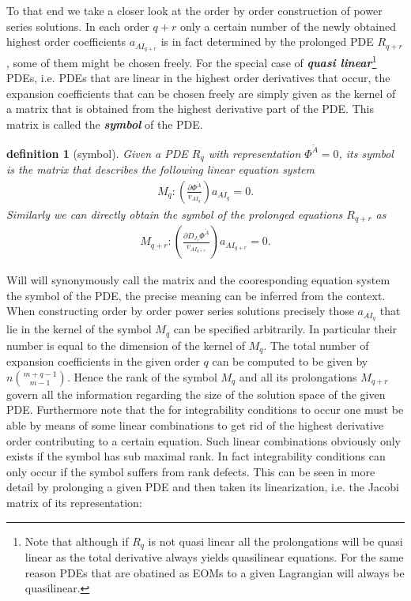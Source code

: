 \documentclass[a4paper,12pt, DIV=14, BCOR=5mm, twoside, headsepline]{scrbook}
\newtheorem{definition}{definition}[section]
\begin{document}
To that end we take a closer look at the order by order construction of power series solutions.
In each order $q+r$ only a certain number of the newly obtained highest order coefficients $a_{AI_{q+r}}$ is in fact determined by the prolonged PDE $R_{q+r}$, some of them might be chosen freely.
For the special case of \textit{\textbf{quasi linear}}\footnote{Note that although if $R_q$ is not quasi linear all the prolongations will be quasi linear as the total derivative always yields quasilinear equations. For the same reason PDEs that are obatined as EOMs to a given Lagrangian will always be quasilinear.} PDEs, i.e. PDEs that are linear in the highest order derivatives that occur, the expansion coefficients that can be chosen freely are simply given as the kernel of a matrix that is obtained from the highest derivative part of the PDE. This matrix is called the \textit{\textbf{symbol}} of the PDE.
\begin{definition}[symbol]
Given a PDE $R_q$ with representation $\Phi^{\tilde{A}}=0$, its symbol is the matrix that describes the following linear equation system 
\begin{align}
    M_q : \left ( \frac{\partial \Phi^{\tilde{A}}}{v_{AI_q}} \right ) a_{AI_q} = 0.
\end{align}
Similarly we can directly obtain the symbol of the prolonged equations $R_{q+r}$ as  
\begin{align}
    M_{q+r} : \left ( \frac{\partial D_{J_r}\Phi^{\tilde{A}
    }}{v_{AI_{q+r}}} \right ) a_{AI_{q+r}} = 0. 
\end{align}
\end{definition}
Will will synonymously call the matrix and the cooresponding equation system the symbol of the PDE, the precise meaning can be inferred from the context. When constructing order by order power series solutions precisely those $a_{AI_q}$ that lie in the kernel of the symbol $M_q$ can be specified arbitrarily. In particular their number is equal to the dimension of the kernel of $M_q$. The total number of expansion coefficients in the given order $q$ can be computed to be given by $n\binom{m+q-1}{m-1}$.
Hence the rank of the symbol $M_q$ and all its prolongations $M_{q+r}$ govern all the information regarding the size of the solution space of the given PDE. Furthermore note that the for integrability conditions to occur one must be able by means of some linear combinations to get rid of the highest derivative order contributing to a certain equation. Such linear combinations obviously only exists if the symbol has sub maximal rank.  In fact integrability conditions can only occur if the symbol suffers from rank defects. This can be seen in more detail by prolonging a given PDE and then taken its linearization, i.e. the Jacobi matrix of its representation:
\end{document}
